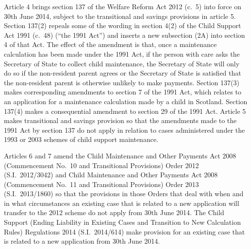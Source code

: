 \documentclass[12pt,a4paper]{article}
\begin{document}
Article 4 brings section 137 of the Welfare Reform Act 2012 (c.~5) into force on 30th June 2014, subject to the transitional and savings provisions in article 5. Section 137(2) repeals some of the wording in section 4(2) of the Child Support Act 1991 (c.~48) (“the 1991 Act”) and inserts a new subsection (2A) into section 4 of that Act. The effect of the amendment is that, once a maintenance calculation has been made under the 1991 Act, if the person with care asks the Secretary of State to collect child maintenance, the Secretary of State will only do so if the non-resident parent agrees or the Secretary of State is satisfied that the non-resident parent is otherwise unlikely to make payments. Section 137(3) makes corresponding amendments to section 7 of the 1991 Act, which relates to an application for a maintenance calculation made by a child in Scotland. Section 137(4) makes a consequential amendment to section 29 of the 1991 Act. Article 5 makes transitional and savings provision so that the amendments made to the 1991 Act by section 137 do not apply in relation to cases administered under the 1993 or 2003 schemes of child support maintenance.

Articles 6 and 7 amend the Child Maintenance and Other Payments Act 2008 (Commencement No.~10 and Transitional Provisions) Order 2012 (S.I.~2012/3042) and Child Maintenance and Other Payments Act 2008 (Commencement No.~11 and Transitional Provisions) Order 2013 (S.I.~2013/1860) so that the provisions in those Orders that deal with when and in what circumstances an existing case that is related to a new application will transfer to the 2012 scheme do not apply from 30th June 2014. The Child Support (Ending Liability in Existing Cases and Transition to New Calculation Rules) Regulations 2014 (S.I.~2014/614) make provision for an existing case that is related to a new application from 30th June 2014. 
\end{document}
